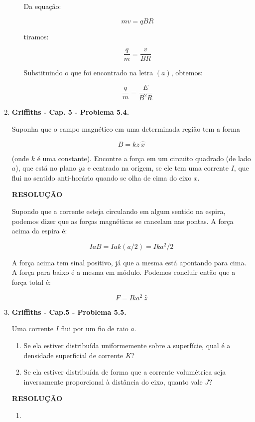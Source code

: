 \documentclass[11pt,a4paper]{article}
\begin{document}
\begin{enumerate}
\begin{enumerate}
Da equação:

$$m v = q B R$$

tiramos:

$$\displaystyle\dfrac{q}{m} = \displaystyle\dfrac{v}{BR}$$

Substituindo o que foi encontrado na letra $(a)$, obtemos:

$$\displaystyle\dfrac{q}{m} = \displaystyle\dfrac{E}{B^2R}$$

\end{enumerate}


\item \textbf{Griffiths - Cap. 5 - Problema 5.4.}


Suponha que o campo magnético em uma determinada região tem a forma

$$B = kz \ \hat{x}$$

(onde $k$ é uma constante). Encontre a força em um circuito quadrado (de lado $a$), que está no plano $yz$ e centrado na origem, se ele tem uma corrente $I$, que flui no sentido anti-horário quando se olha de cima do eixo $x$.

\textbf{RESOLUÇÃO}

Supondo que a corrente esteja circulando em algum sentido na espira, podemos dizer que as forças magnéticas se cancelam nas pontas. A força acima da espira é:

$$IaB = Iak(a/2) = Ika^2/2$$

A força acima tem sinal positivo, já que a mesma está apontando para cima. A força para baixo é a mesma em módulo. Podemos concluir então que a força total é:

$$F = Ika^2 \ \hat{z}$$


\item \textbf{Griffiths - Cap.5 - Problema 5.5.}

Uma corrente $I$ flui por um fio de raio $a$.

\begin{enumerate}
\item Se ela estiver distribuída uniformemente sobre a superfície, qual é a densidade superficial de corrente $K$?
\item Se ela estiver distribuída de forma que a corrente volumétrica seja inversamente proporcional à distância do eixo, quanto vale $J$?
\end{enumerate}

\textbf{RESOLUÇÃO}

\begin{enumerate}

\item


\end{enumerate}
\end{enumerate}
\end{document}
